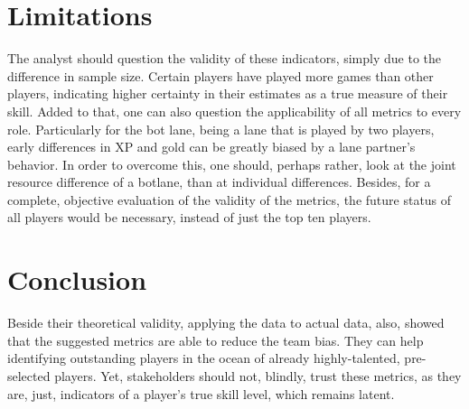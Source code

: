 \documentclass{article}
\begin{document}
\section{Limitations}
The analyst should question the validity of these indicators, simply due to the difference in sample size. Certain players have played more games than other players, indicating higher certainty in their estimates as a true measure of their skill.  \newline Added to that, one can also question the applicability of all metrics to every role. Particularly for the bot lane, being a lane that is played by two players, early differences in XP and gold can be greatly biased by a lane partner's behavior. In order to overcome this, one should, perhaps rather, look at the joint resource difference of a botlane, than at individual differences. \newline Besides, for a complete, objective evaluation of the validity of the metrics, the future status of all players would be necessary, instead of just the top ten players.

\section{Conclusion}
Beside their theoretical validity, applying the data to actual data, also, showed that the suggested metrics are able to reduce the team bias. They can help identifying outstanding players in the ocean of already highly-talented, pre-selected players. Yet, stakeholders should not, blindly, trust these metrics, as they are, just, indicators of a player's true skill level, which remains latent.











\end{document}
